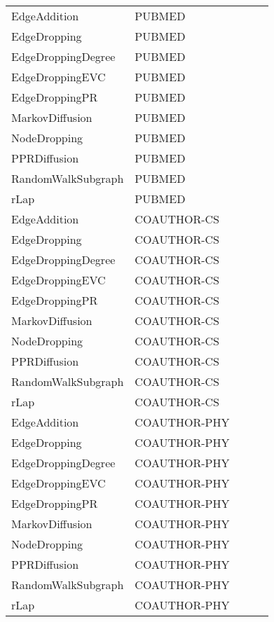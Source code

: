 \documentclass{article}
\theoremstyle{plain}
\theoremstyle{definition}
\theoremstyle{remark}
\begin{document}
\begin{table}[H]
\begin{center}
\begin{small}
\begin{sc}
\begin{tabular}{llll|l}
      EdgeAddition &       PUBMED &     &    &   \\
      EdgeDropping &       PUBMED &      &     &   \\
EdgeDroppingDegree &       PUBMED &     &      &   \\
   EdgeDroppingEVC &       PUBMED &   &    &   \\
    EdgeDroppingPR &       PUBMED &      &    &   \\
   MarkovDiffusion &       PUBMED &    &   &    \\
      NodeDropping &       PUBMED &       &    &      \\
      PPRDiffusion &       PUBMED &    &   &   \\
RandomWalkSubgraph &       PUBMED &      &    &    \\
              rLap &       PUBMED &     &    &   \\
\midrule
      EdgeAddition &  COAUTHOR-CS &     &    &   \\
      EdgeDropping &  COAUTHOR-CS &      &     &   \\
EdgeDroppingDegree &  COAUTHOR-CS &      &    &   \\
   EdgeDroppingEVC &  COAUTHOR-CS &    &   &   \\
    EdgeDroppingPR &  COAUTHOR-CS &       &    &    \\
   MarkovDiffusion &  COAUTHOR-CS &  &   &   \\
      NodeDropping &  COAUTHOR-CS &      &    &   \\
      PPRDiffusion &  COAUTHOR-CS &    &   &   \\
RandomWalkSubgraph &  COAUTHOR-CS &      &    &    \\
  
              rLap &  COAUTHOR-CS &      &    &  \\
              \midrule
      EdgeAddition & COAUTHOR-PHY &     &    &   \\
      EdgeDropping & COAUTHOR-PHY &     &    &       \\
EdgeDroppingDegree & COAUTHOR-PHY &      &    &      \\
   EdgeDroppingEVC & COAUTHOR-PHY &   &   &  \\
    EdgeDroppingPR & COAUTHOR-PHY &     &    &    \\
   MarkovDiffusion & COAUTHOR-PHY &        &  &  \\
      NodeDropping & COAUTHOR-PHY &      &    &    \\
      PPRDiffusion & COAUTHOR-PHY &      &   &   \\
RandomWalkSubgraph & COAUTHOR-PHY &      &     &   \\
            
              rLap & COAUTHOR-PHY &     &     &   \\
\bottomrule
\end{tabular}
\end{sc}
\end{small}
\end{center}
\vskip -0.1in
\end{table}
\end{document}
